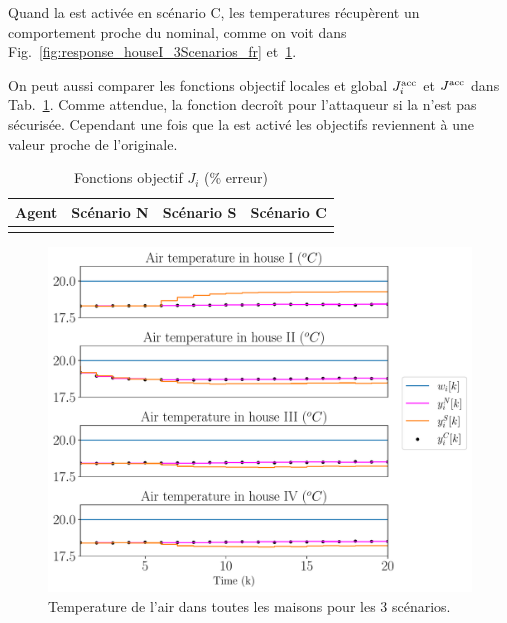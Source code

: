 \documentclass[../main.tex]{subfiles}
\begin{document}
Quand la \rpdmpcss{} est activée en scénario C, les temperatures récupèrent un comportement proche du nominal, comme on voit dans Fig.~\ref{fig:response_houseI_3Scenarios_fr} et~\ref{fig:response_housesII_to_IV_3Scenarios_fr}.


On peut aussi comparer les fonctions objectif locales et global $J_{i}^{\text{acc}}$ et $J^{\text{acc}}$ dans Tab.~\ref{tab:eq_costsGlobalLocal_fr}.
Comme attendue, la fonction decroît pour l'attaqueur si la \dmpc{} n'est pas sécurisée. Cependant une fois que la \rpdmpcss{} est activé les objectifs reviennent à une valeur proche de l'originale.

\begin{table}[h]
  \centering
  \caption{Fonctions objectif $J_{i}$ (\% erreur)}\label{tab:eq_costsGlobalLocal_fr}
  \begin{tabular}[t]{cccc}
    \toprule
    Agent  & Scénario N& Scénario S & Scénario C\\
    \midrule
    \\
    \bottomrule
  \end{tabular}
\end{table}

\begin{figure}[H]
  \centering
 \includegraphics[width=.7\textwidth,trim=0 .3cm 0 .2cm,clip]{../img/resilient_eq/ErrorWX_command_normErrH_all_houses.pdf}
  \caption{Temperature de l'air dans toutes les maisons pour les 3 scénarios.}\label{fig:response_housesII_to_IV_3Scenarios_fr}
\end{figure}
\end{document}
